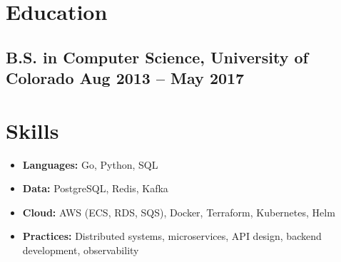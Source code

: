 \documentclass[11pt]{article}
\begin{document}
\section*{Education}
\subsection*{B.S. in Computer Science, University of Colorado \hfill Aug 2013 -- May 2017}

\section*{Skills}
\begin{itemize}
  \item \textbf{Languages:} Go, Python, SQL
  \item \textbf{Data:} PostgreSQL, Redis, Kafka
  \item \textbf{Cloud:} AWS (ECS, RDS, SQS), Docker, Terraform, Kubernetes, Helm
  \item \textbf{Practices:} Distributed systems, microservices, API design, backend development, observability
\end{itemize}
\end{document}
